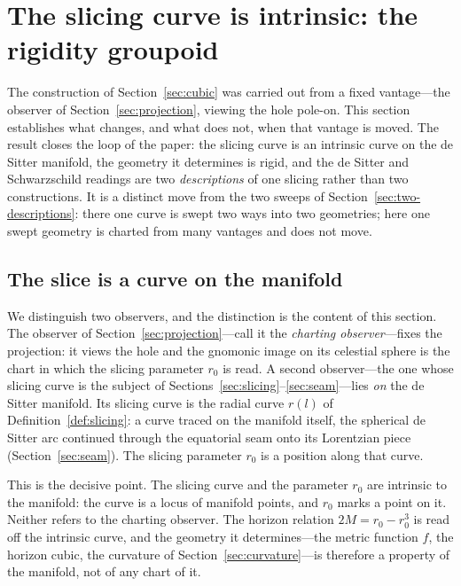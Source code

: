 \documentclass[11pt,a4paper]{article}
\theoremstyle{definition}
\begin{document}
\section{The slicing curve is intrinsic: the rigidity groupoid}\label{sec:groupoid}

The construction of Section~\ref{sec:cubic} was carried out from a fixed vantage---the observer of Section~\ref{sec:projection}, viewing the hole pole-on. This section establishes what changes, and what does not, when that vantage is moved. The result closes the loop of the paper: the slicing curve is an intrinsic curve on the de Sitter manifold, the geometry it determines is rigid, and the de Sitter and Schwarzschild readings are two \emph{descriptions} of one slicing rather than two constructions. It is a distinct move from the two sweeps of Section~\ref{sec:two-descriptions}: there one curve is swept two ways into two geometries; here one swept geometry is charted from many vantages and does not move.

\subsection{The slice is a curve on the manifold}\label{sec:intrinsic-slice}

We distinguish two observers, and the distinction is the content of this section. The observer of Section~\ref{sec:projection}---call it the \emph{charting observer}---fixes the projection: it views the hole and the gnomonic image on its celestial sphere is the chart in which the slicing parameter $r_{0}$ is read. A second observer---the one whose slicing curve is the subject of Sections~\ref{sec:slicing}--\ref{sec:seam}---lies \emph{on} the de Sitter manifold. Its slicing curve is the radial curve $r(l)$ of Definition~\ref{def:slicing}: a curve traced on the manifold itself, the spherical de Sitter arc continued through the equatorial seam onto its Lorentzian piece (Section~\ref{sec:seam}). The slicing parameter $r_{0}$ is a position along that curve.

This is the decisive point. The slicing curve and the parameter $r_{0}$ are intrinsic to the manifold: the curve is a locus of manifold points, and $r_{0}$ marks a point on it. Neither refers to the charting observer. The horizon relation $2M=r_{0}-r_{0}^{3}$ is read off the intrinsic curve, and the geometry it determines---the metric function $f$, the horizon cubic, the curvature of Section~\ref{sec:curvature}---is therefore a property of the manifold, not of any chart of it.
\end{document}
